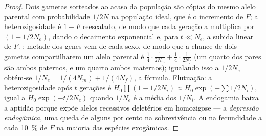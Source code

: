 \begin{proof}
Dois gametas sorteados ao acaso da população são cópias do mesmo alelo
parental com probabilidade $1/2N$ na população ideal, que é o incremento
de $F$; a heterozigosidade é $1 - F$ reescalado, de modo que cada geração
a multiplica por $(1 - 1/2N_{e})$, dando o decaimento exponencial e, para
$t \ll N_{e}$, a subida linear de $F$. : metade dos genes vem
de cada sexo, de modo que a chance de dois gametas compartilharem um
alelo parental é $\tfrac{1}{4}\cdot\tfrac{1}{2N_{m}} +
\tfrac{1}{4}\cdot\tfrac{1}{2N_{f}}$ (um quarto dos pares são ambos
paternos, e um quarto ambos maternos); igualando isso a $1/2N_{e}$
obtém-se $1/N_{e} = 1/(4N_{m}) + 1/(4N_{f})$, a fórmula. Flutuação: a
heterozigosidade após $t$ gerações é $H_{0}\prod(1 - 1/2N_{i})
\approx H_{0}\exp(-\sum 1/2N_{i})$, igual a $H_{0}\exp(-t/2N_{e})$ quando
$1/N_{e}$ é a média dos $1/N_{i}$. A endogamia baixa a aptidão porque
expõe alelos recessivos deletérios em homozigose --- a \emph{depressão
endogâmica}, uma queda de alguns por cento na sobrevivência ou na
fecundidade a cada \qty{10}{\%} de $F$ na maioria das espécies
exogâmicas.
\end{proof}

